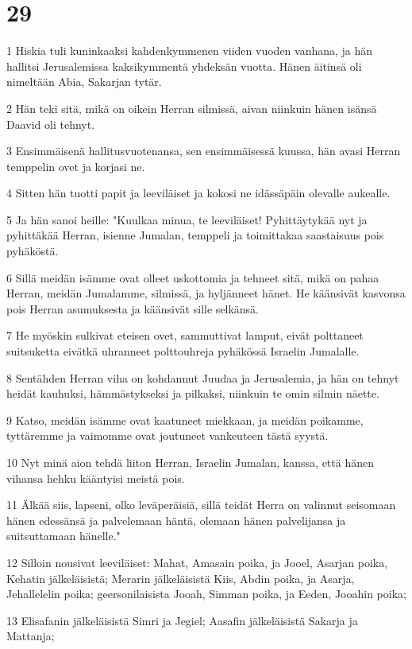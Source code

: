 \chapter{29}

\par 1 Hiskia tuli kuninkaaksi kahdenkymmenen viiden vuoden vanhana, ja hän hallitsi Jerusalemissa kaksikymmentä yhdeksän vuotta. Hänen äitinsä oli nimeltään Abia, Sakarjan tytär.
\par 2 Hän teki sitä, mikä on oikein Herran silmissä, aivan niinkuin hänen isänsä Daavid oli tehnyt.
\par 3 Ensimmäisenä hallitusvuotenansa, sen ensimmäisessä kuussa, hän avasi Herran temppelin ovet ja korjasi ne.
\par 4 Sitten hän tuotti papit ja leeviläiset ja kokosi ne idässäpäin olevalle aukealle.
\par 5 Ja hän sanoi heille: "Kuulkaa minua, te leeviläiset! Pyhittäytykää nyt ja pyhittäkää Herran, isienne Jumalan, temppeli ja toimittakaa saastaisuus pois pyhäköstä.
\par 6 Sillä meidän isämme ovat olleet uskottomia ja tehneet sitä, mikä on pahaa Herran, meidän Jumalamme, silmissä, ja hyljänneet hänet. He käänsivät kasvonsa pois Herran asumuksesta ja käänsivät sille selkänsä.
\par 7 He myöskin sulkivat eteisen ovet, sammuttivat lamput, eivät polttaneet suitsuketta eivätkä uhranneet polttouhreja pyhäkössä Israelin Jumalalle.
\par 8 Sentähden Herran viha on kohdannut Juudaa ja Jerusalemia, ja hän on tehnyt heidät kauhuksi, hämmästykseksi ja pilkaksi, niinkuin te omin silmin näette.
\par 9 Katso, meidän isämme ovat kaatuneet miekkaan, ja meidän poikamme, tyttäremme ja vaimomme ovat joutuneet vankeuteen tästä syystä.
\par 10 Nyt minä aion tehdä liiton Herran, Israelin Jumalan, kanssa, että hänen vihansa hehku kääntyisi meistä pois.
\par 11 Älkää siis, lapseni, olko leväperäisiä, sillä teidät Herra on valinnut seisomaan hänen edessänsä ja palvelemaan häntä, olemaan hänen palvelijansa ja suitsuttamaan hänelle."
\par 12 Silloin nousivat leeviläiset: Mahat, Amasain poika, ja Jooel, Asarjan poika, Kehatin jälkeläisistä; Merarin jälkeläisistä Kiis, Abdin poika, ja Asarja, Jehallelelin poika; geersonilaisista Jooah, Simman poika, ja Eeden, Jooahin poika;
\par 13 Elisafanin jälkeläisistä Simri ja Jegiel; Aasafin jälkeläisistä Sakarja ja Mattanja;
